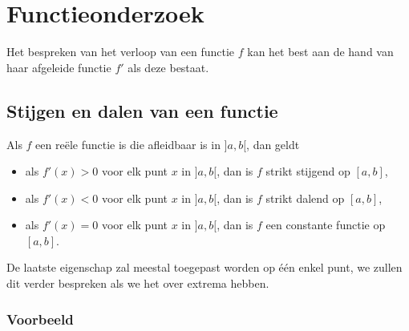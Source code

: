 \documentclass[12pt]{article}
\newenvironment{eigenschap}
{
  \begin{mdframed}[nobreak=true,frametitle={Eigenschap}]
  }{%
  \end{mdframed}
}
\begin{document}
\pagebreak
\section{Functieonderzoek}

Het bespreken van het verloop van een functie $f$ kan het best aan de hand van haar afgeleide functie $f'$ als deze bestaat.

\subsection{Stijgen en dalen van een functie}

\begin{eigenschap}
  Als $f$ een reële functie is die afleidbaar is in $]a,b[$, dan geldt
  \begin{itemize}
  \item als $f'(x)>0$ voor elk punt $x$ in $]a,b[$, dan is $f$ strikt stijgend op $[a,b]$,
  \item als $f'(x)<0$ voor elk punt $x$ in $]a,b[$, dan is $f$ strikt dalend op $[a,b]$,
  \item als $f'(x)=0$ voor elk punt $x$ in $]a,b[$, dan is $f$ een constante functie op $[a,b]$.
  \end{itemize}
\end{eigenschap}

De laatste eigenschap zal meestal toegepast worden op één enkel punt, we zullen dit verder bespreken als we het over extrema hebben.

\subsubsection*{Voorbeeld}
\end{document}
